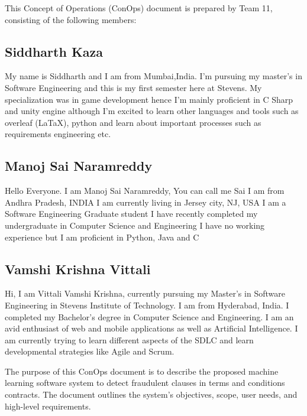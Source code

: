  {}
 
This Concept of Operations (ConOps) document is prepared by Team 11, consisting of the following members:\\



\subsection*{Siddharth Kaza}
My name is Siddharth and I am from Mumbai,India. I'm pursuing my master's in Software Engineering and this is my first semester here at Stevens. My specialization was in game development hence I'm mainly proficient in C Sharp and unity engine although I'm excited to learn other languages and tools such as overleaf (LaTaX), python and learn about important processes such as requirements engineering etc. 

\subsection*{Manoj Sai Naramreddy}
Hello Everyone. I am Manoj Sai Naramreddy, You can call me Sai
I am from Andhra Pradesh, INDIA
I am currently living in Jersey city, NJ, USA
I am a Software Engineering Graduate student
I have recently completed my undergraduate in Computer Science and Engineering
I have no working experience but I am proficient in Python, Java and  C

\subsection*{Vamshi Krishna Vittali}
Hi, I am Vittali Vamshi Krishna, currently pursuing my Master's in Software Engineering in Stevens Institute of Technology. I am from Hyderabad, India. I completed my Bachelor's degree in Computer Science and Engineering. I am an avid enthusiast of web and mobile applications as well as Artificial Intelligence. I am currently trying to learn different aspects of the SDLC and learn developmental strategies like Agile and Scrum.\newline

The purpose of this ConOps document is to describe the proposed machine learning software system to detect fraudulent clauses in terms and conditions contracts. The document outlines the system's objectives, scope, user needs, and high-level requirements.


\newpage

